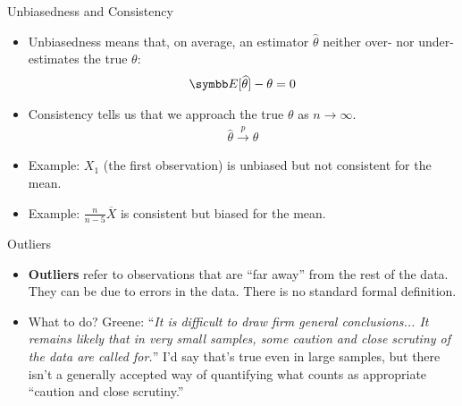 \documentclass[aspectratio=169,11pt]{beamer}
\begin{document}
\begin{frame}{Unbiasedness and Consistency}
\begin{itemize}
\item Unbiasedness means that, on average, an estimator $\widehat{\theta}$ neither over- nor under-estimates the true $\theta$:
\begin{align*}
\E[\widehat{\theta} ] - \theta = 0
\end{align*}
\item Consistency tells us that we approach the true $\theta$ as $n \rightarrow \infty$.
\begin{align*}
\widehat{\theta}  \overset{p}{\to} \theta
\end{align*}
\item Example: $X_{1}$ (the first observation) is unbiased but not consistent for the mean.
\item Example: $\frac{n}{n-5} \overline{X}$ is consistent but biased for the mean.
\end{itemize}
\end{frame}



\begin{frame}{Outliers}
\begin{itemize}
	\item {\bf Outliers} refer to observations that are ``far away'' from the rest of the data. 
	They can be due to errors in the data.  There is no standard formal definition. 

	\medskip
	\item What to do? Greene: ``\emph{It is difficult to draw firm general conclusions... It remains likely that in very
	small samples, some caution and close scrutiny of the data are called for.}'' I'd say that's true even in large samples,
	but there isn't a generally accepted way of quantifying what counts as appropriate ``caution and close scrutiny.''


\end{itemize}
\end{frame}
\end{document}
